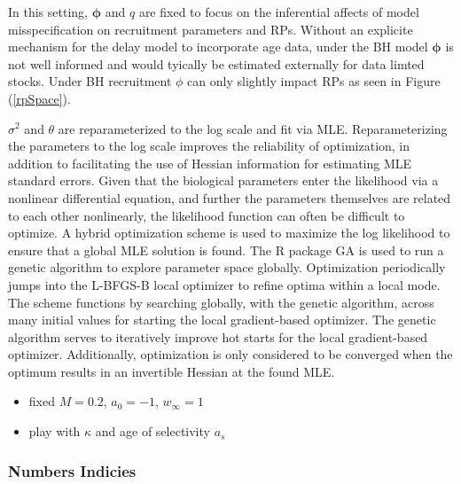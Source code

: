 %
In this setting, $\bm{\phi}$ and $q$ are fixed %
to focus on the inferential affects of model misspecification on recruitment
parameters and RPs. Without an explicite mechanism for the delay model to incorporate
age data, under the BH model $\bm{\phi}$ is not well informed and would
tyically be estimated externally for data limted stocks. Under BH recruitment
$\phi$ can only slightly impact RPs as seen in Figure (\ref{rpSpace}).

%
$\sigma^2$ and $\theta$ are reparameterized to the log scale and fit via MLE.
Reparameterizing the parameters to the log scale improves the reliability of
optimization, in addition to facilitating the use of Hessian information for
estimating MLE standard errors. Given that the biological parameters enter the
likelihood via a nonlinear differential equation, and further the parameters
themselves are related to each other nonlinearly, the likelihood function can
often be difficult to optimize. A hybrid optimization scheme is used to
maximize the log likelihood to ensure that a global MLE solution is found. The
R package GA \cite{scrucca_ga_2013, scrucca_extensions_2017} is used to
run a genetic algorithm to explore parameter space globally. Optimization
periodically jumps into the L-BFGS-B local optimizer to refine optima within a
local mode. The scheme functions by searching globally, with the genetic
algorithm, across many initial values for starting the local gradient-based
optimizer. The genetic algorithm serves to iteratively improve hot starts for
the local gradient-based optimizer. Additionally, optimization is only
considered to be converged when the optimum results in an invertible Hessian at
the found MLE.

\begin{itemize}
\item fixed $M=0.2$, $a_0=-1$, $w_\infty=1$
\item play with $\kappa$ and age of selectivity $a_s$
\end{itemize}

%
\subsubsection{Numbers Indicies}

